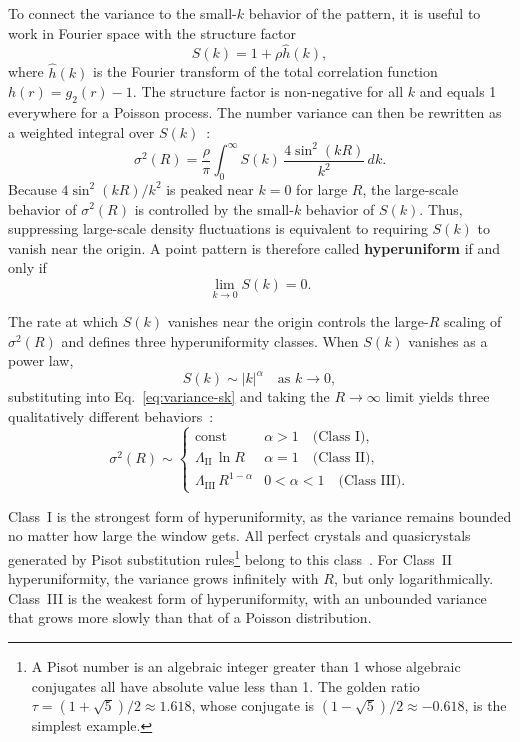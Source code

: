 \documentclass[11pt]{article}
\begin{document}
To connect the variance to the small-$k$ behavior of the pattern, it is useful to work in Fourier space with the structure factor~\cite{torquato2003local}
\begin{equation}
 S(k) = 1 + \rho\hat{h}(k),
 \label{eq:sk-def}
\end{equation}
where $\hat{h}(k)$ is the Fourier transform of the total correlation function $h(r) = g_2(r) - 1$. The structure factor is non-negative for all $k$ and equals 1 everywhere for a Poisson process. The number variance can then be rewritten as a weighted integral over $S(k)$~\cite{torquato2003local,zachary2009hyperuniform}:
\begin{equation}
 \sigma^2(R) = \frac{\rho}{\pi}\int_0^\infty S(k)\,
 \frac{4\sin^2(kR)}{k^2}\,dk.
 \label{eq:variance-sk}
\end{equation}
Because $4\sin^2(kR)/k^2$ is peaked near $k = 0$ for large $R$, the large-scale behavior of $\sigma^2(R)$ is controlled by the small-$k$ behavior of $S(k)$. Thus, suppressing large-scale density fluctuations is equivalent to requiring $S(k)$ to vanish near the origin. A point pattern is therefore called \textbf{hyperuniform} if and only if~\cite{torquato2003local}
\begin{equation}
 \lim_{k \to 0} S(k) = 0.
 \label{eq:hu-condition}
\end{equation}

The rate at which $S(k)$ vanishes near the origin controls the large-$R$ scaling of $\sigma^2(R)$ and defines three hyperuniformity classes. When $S(k)$ vanishes as a power law,
\begin{equation}
 S(k) \sim |k|^\alpha \quad \text{as } k \to 0,
 \label{eq:sk-powerlaw}
\end{equation}
substituting into Eq.~\eqref{eq:variance-sk} and taking the $R \to \infty$ limit yields three qualitatively different behaviors~\cite{torquato2003local,torquato2018hyperuniform}:
\begin{equation}
 \sigma^2(R) \sim
 \begin{cases}
   \text{const} & \alpha > 1 \quad \text{(Class~I)}, \\[4pt]
   \Lambda_\text{II}\,\ln R & \alpha = 1 \quad \text{(Class~II)}, \\[4pt]
   \Lambda_\text{III}\,R^{1-\alpha} & 0 < \alpha < 1 \quad \text{(Class~III)}.
 \end{cases}
 \label{eq:three-classes}
\end{equation}

Class~I is the strongest form of hyperuniformity, as the variance remains bounded no matter how large the window gets. All perfect crystals and quasicrystals generated by Pisot substitution rules\footnote{A Pisot number is an algebraic integer greater than 1 whose algebraic conjugates all have absolute value less than 1. The golden ratio $\tau = (1+\sqrt{5})/2 \approx 1.618$, whose conjugate is $(1-\sqrt{5})/2 \approx -0.618$, is the simplest example.} belong to this class~\cite{oguz2019substitution}. For Class~II hyperuniformity, the variance grows infinitely with $R$, but only logarithmically. Class~III is the weakest form of hyperuniformity, with an unbounded variance that grows more slowly than that of a Poisson distribution. 
\end{document}
